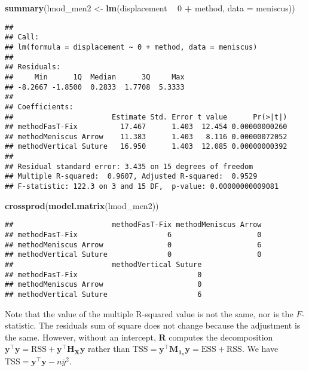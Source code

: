 \documentclass[]{book}
\newenvironment{Shaded}{\begin{snugshade}}{\end{snugshade}}
\newcommand{\DataTypeTok}[1]{\textcolor[rgb]{0.13,0.29,0.53}{#1}}
\newcommand{\DecValTok}[1]{\textcolor[rgb]{0.00,0.00,0.81}{#1}}
\newcommand{\KeywordTok}[1]{\textcolor[rgb]{0.13,0.29,0.53}{\textbf{#1}}}
\newcommand{\NormalTok}[1]{#1}
\newcommand{\OperatorTok}[1]{\textcolor[rgb]{0.81,0.36,0.00}{\textbf{#1}}}
\newcommand{\StringTok}[1]{\textcolor[rgb]{0.31,0.60,0.02}{#1}}
\theoremstyle{definition}
\theoremstyle{definition}
\theoremstyle{definition}
\theoremstyle{remark}
\begin{document}
\begin{Shaded}
\begin{Highlighting}[]
\KeywordTok{summary}\NormalTok{(lmod_men2 <-}\StringTok{ }\KeywordTok{lm}\NormalTok{(displacement }\OperatorTok{~}\StringTok{ }\DecValTok{0} \OperatorTok{+}\StringTok{ }\NormalTok{method, }\DataTypeTok{data =}\NormalTok{ meniscus))}
\end{Highlighting}
\end{Shaded}

\begin{verbatim}
## 
## Call:
## lm(formula = displacement ~ 0 + method, data = meniscus)
## 
## Residuals:
##     Min      1Q  Median      3Q     Max 
## -8.2667 -1.8500  0.2833  1.7708  5.3333 
## 
## Coefficients:
##                       Estimate Std. Error t value      Pr(>|t|)
## methodFasT-Fix          17.467      1.403  12.454 0.00000000260
## methodMeniscus Arrow    11.383      1.403   8.116 0.00000072052
## methodVertical Suture   16.950      1.403  12.085 0.00000000392
## 
## Residual standard error: 3.435 on 15 degrees of freedom
## Multiple R-squared:  0.9607, Adjusted R-squared:  0.9529 
## F-statistic: 122.3 on 3 and 15 DF,  p-value: 0.00000000009081
\end{verbatim}

\begin{Shaded}
\begin{Highlighting}[]
\KeywordTok{crossprod}\NormalTok{(}\KeywordTok{model.matrix}\NormalTok{(lmod_men2))}
\end{Highlighting}
\end{Shaded}

\begin{verbatim}
##                       methodFasT-Fix methodMeniscus Arrow
## methodFasT-Fix                     6                    0
## methodMeniscus Arrow               0                    6
## methodVertical Suture              0                    0
##                       methodVertical Suture
## methodFasT-Fix                            0
## methodMeniscus Arrow                      0
## methodVertical Suture                     6
\end{verbatim}

Note that the value of the multiple R-squared value is not the same, nor
is the \(F\)-statistic. The residuals sum of square does not change
because the adjustment is the same. However, without an intercept,
\textbf{R} computes the decomposition
\(\boldsymbol{y}^\top\boldsymbol{y} = \mathrm{RSS} + \boldsymbol{y}^\top\mathbf{H}_{\mathbf{X}}\boldsymbol{y}\)
rather than
\(\mathrm{TSS} = \boldsymbol{y}^\top\mathbf{M}_{\mathbf{1}_n}\boldsymbol{y}= \mathrm{ESS}+\mathrm{RSS}\).
We have \(\mathrm{TSS} = \boldsymbol{y}^\top\boldsymbol{y}-n\bar{y}^2\).
\end{document}
